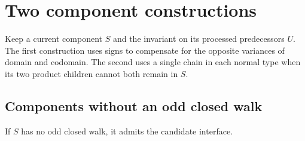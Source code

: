 \section{Two component constructions}
\label{sec:simple-components}

Keep a current component $S$ and the invariant on its processed
predecessors $U$. The first construction uses signs to compensate for
the opposite variances of domain and codomain. The second uses a
single chain in each normal type when its two product children cannot
both remain in $S$.

\subsection{Components without an odd closed walk}

\begin{proposition}
\label{prop:signed-component}
If $S$ has no odd closed walk, it admits the candidate interface.
\end{proposition}

